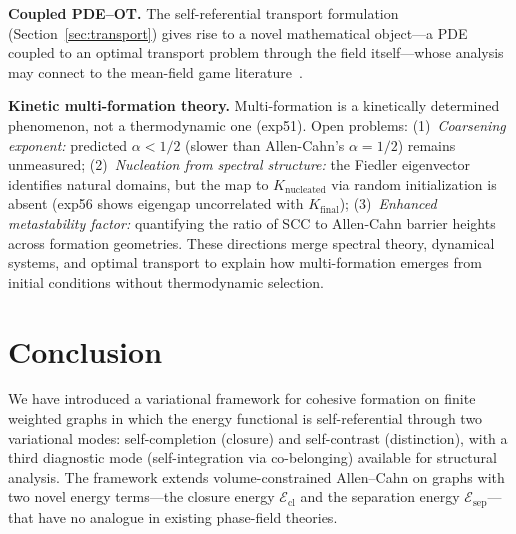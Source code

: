 \documentclass[lettersize,journal]{IEEEtran}
\begin{document}
\textbf{Coupled PDE--OT.} The self-referential transport formulation (Section~\ref{sec:transport}) gives rise to a novel mathematical object---a PDE coupled to an optimal transport problem through the field itself---whose analysis may connect to the mean-field game literature~\cite{LasryLions2007}.

\textbf{Kinetic multi-formation theory.} Multi-formation is a kinetically determined phenomenon, not a thermodynamic one (exp51). Open problems: (1)~\emph{Coarsening exponent:} predicted $\alpha < 1/2$ (slower than Allen-Cahn's $\alpha = 1/2$) remains unmeasured; (2)~\emph{Nucleation from spectral structure:} the Fiedler eigenvector identifies natural domains, but the map to $K_{\mathrm{nucleated}}$ via random initialization is absent (exp56 shows eigengap uncorrelated with $K_{\mathrm{final}}$); (3)~\emph{Enhanced metastability factor:} quantifying the ratio of SCC to Allen-Cahn barrier heights across formation geometries. These directions merge spectral theory, dynamical systems, and optimal transport to explain how multi-formation emerges from initial conditions without thermodynamic selection.

\section{Conclusion}
\label{sec:conclusion}

We have introduced a variational framework for cohesive formation on finite weighted graphs in which the energy functional is self-referential through two variational modes: self-completion (closure) and self-contrast (distinction), with a third diagnostic mode (self-integration via co-belonging) available for structural analysis. The framework extends volume-constrained Allen--Cahn on graphs with two novel energy terms---the closure energy $\mathcal{E}_{\mathrm{cl}}$ and the separation energy $\mathcal{E}_{\mathrm{sep}}$---that have no analogue in existing phase-field theories.
\end{document}

